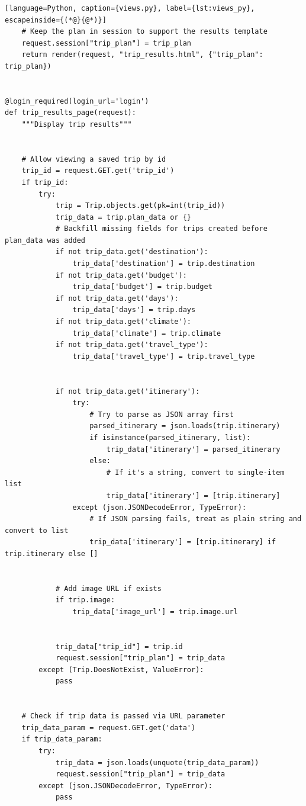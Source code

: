 \begin{lstlisting}[language=Python, caption={views.py}, label={lst:views_py}, escapeinside={(*@}{@*)}]
    # Keep the plan in session to support the results template
    request.session["trip_plan"] = trip_plan
    return render(request, "trip_results.html", {"trip_plan": trip_plan})


@login_required(login_url='login')
def trip_results_page(request):
    """Display trip results"""


    # Allow viewing a saved trip by id
    trip_id = request.GET.get('trip_id')
    if trip_id:
        try:
            trip = Trip.objects.get(pk=int(trip_id))
            trip_data = trip.plan_data or {}
            # Backfill missing fields for trips created before plan_data was added
            if not trip_data.get('destination'):
                trip_data['destination'] = trip.destination
            if not trip_data.get('budget'):
                trip_data['budget'] = trip.budget
            if not trip_data.get('days'):
                trip_data['days'] = trip.days
            if not trip_data.get('climate'):
                trip_data['climate'] = trip.climate
            if not trip_data.get('travel_type'):
                trip_data['travel_type'] = trip.travel_type


            if not trip_data.get('itinerary'):
                try:
                    # Try to parse as JSON array first
                    parsed_itinerary = json.loads(trip.itinerary)
                    if isinstance(parsed_itinerary, list):
                        trip_data['itinerary'] = parsed_itinerary
                    else:
                        # If it's a string, convert to single-item list
                        trip_data['itinerary'] = [trip.itinerary]
                except (json.JSONDecodeError, TypeError):
                    # If JSON parsing fails, treat as plain string and convert to list
                    trip_data['itinerary'] = [trip.itinerary] if trip.itinerary else []


            # Add image URL if exists
            if trip.image:
                trip_data['image_url'] = trip.image.url


            trip_data["trip_id"] = trip.id
            request.session["trip_plan"] = trip_data
        except (Trip.DoesNotExist, ValueError):
            pass


    # Check if trip data is passed via URL parameter
    trip_data_param = request.GET.get('data')
    if trip_data_param:
        try:
            trip_data = json.loads(unquote(trip_data_param))
            request.session["trip_plan"] = trip_data
        except (json.JSONDecodeError, TypeError):
            pass



\end{lstlisting}
